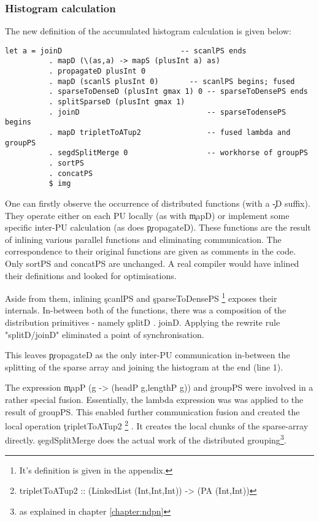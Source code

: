     \subsubsection{Histogram calculation}
      The new definition of the accumulated histogram calculation is given below:
      \begin{lstlisting}
let a = joinD                           -- scanlPS ends
          . mapD (\(as,a) -> mapS (plusInt a) as)
          . propagateD plusInt 0
          . mapD (scanlS plusInt 0)       -- scanlPS begins; fused
          . sparseToDenseD (plusInt gmax 1) 0 -- sparseToDensePS ends
          . splitSparseD (plusInt gmax 1)     
          . joinD                             -- sparseTodensePS begins
          . mapD tripletToATup2               -- fused lambda and groupPS 
          . segdSplitMerge 0                  -- workhorse of groupPS
          . sortPS
          . concatPS
          $ img
      \end{lstlisting}
      One can firstly observe the occurrence of distributed functions (with a \c{-D} suffix). They operate either
      on each PU locally (as with \c{mapD}) or implement some specific inter-PU calculation (as does \c{propagateD}).
      These functions are the result of inlining various parallel functions and eliminating communication.
      The correspondence to their original functions are given as comments in the code. Only sortPS and concatPS
      are unchanged. A real compiler would have inlined their definitions and looked for optimisations.      
      
      Aside from them, inlining \c{scanlPS} and \c{sparseToDensePS}
      \footnote{It's definition is given in the appendix.} exposes their internals.
      In-between both of the functions, there was a composition of the distribution primitives - namely \c{splitD . joinD}.
      Applying the rewrite rule "splitD/joinD" eliminated a point of synchronisation.
      
      This leaves \c{propagateD} as the only inter-PU communication in-between the splitting of the
      sparse array and joining the histogram at the end (line 1).
      
      The expression \c{mapP (\lam g -> (headP g,lengthP g))} and \c{groupPS}
      were involved in a rather special fusion. Essentially, the lambda expression was
      was applied to the result of groupPS. This enabled further communication
      fusion and created the local operation \c{tripletToATup2}
      \footnote{tripletToATup2 :: (LinkedList (Int,Int,Int)) -> (PA (Int,Int))}
      . It creates the
      local chunks of the sparse-array directly. \c{segdSplitMerge} does the
      actual work of the distributed grouping\footnote{as explained in chapter \ref{chapter:ndpn}}.
      
